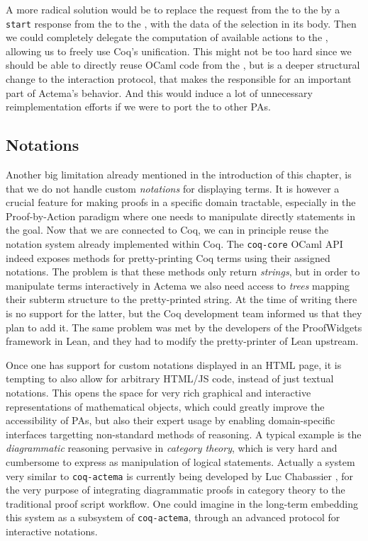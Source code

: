 A more radical solution would be to replace the  request from
the  to the  by a \texttt{start} response
from the  to the , with the data of the
selection in its body. Then we could completely delegate the computation of
available actions to the , allowing us to freely use Coq's
unification. This might not be too hard since we should be able to directly
reuse OCaml code from the , but is a deeper structural change
to the interaction protocol, that makes the  responsible for an
important part of Actema's behavior. And this would induce a lot of unnecessary
reimplementation efforts if we were to port the  to other PAs.

\subsection{Notations}

Another big limitation already mentioned in the introduction of this chapter, is
that we do not handle custom \emph{notations} for displaying
terms. It is however a crucial feature for making proofs in a specific
domain tractable, especially in the Proof-by-Action paradigm where one needs to
manipulate directly statements in the goal. Now that we are connected to Coq, we
can in principle reuse the notation system already implemented within Coq. The
\texttt{coq-core} OCaml API indeed exposes methods for pretty-printing Coq terms
using their assigned notations. The problem is that these methods only return
\emph{strings}, but in order to manipulate terms interactively in Actema we also
need access to \emph{trees} mapping their subterm structure to the
pretty-printed string. At the time of writing there is no support for the
latter, but the Coq development team informed us that they plan to add it. The
same problem was met by the developers of the ProofWidgets framework in Lean,
and they had to modify the pretty-printer of Lean upstream.

Once one has support for custom notations displayed in an HTML page, it is
tempting to also allow for arbitrary HTML/JS code, instead of just textual
notations. This opens the space for very rich graphical and interactive
representations of mathematical objects, which could greatly improve the
accessibility of PAs, but also their expert usage by enabling domain-specific
interfaces targetting non-standard methods of reasoning. A typical example is
the \emph{diagrammatic} reasoning pervasive in \emph{category theory}, which is
very hard and cumbersome to express as manipulation of logical statements.
Actually a system very similar to \texttt{coq-actema} is currently being
developed by Luc Chabassier \cite{LucTalk}, for the very purpose of integrating
diagrammatic proofs in category theory to the traditional proof script workflow.
One could imagine in the long-term embedding this system as a subsystem of
\texttt{coq-actema}, through an advanced protocol for interactive notations.


